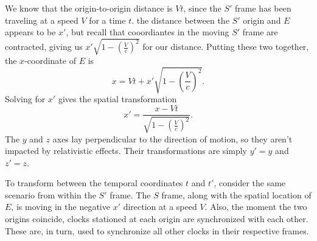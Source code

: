 \documentclass[10pt,a4paper,oneside]{book}
\begin{document}
We know that the origin-to-origin distance is $Vt$, since the $S'$ frame has been traveling at a speed $V$ for a time $t$.
the distance between the $S'$ origin and $E$ appears to be $x'$, but recall that cooordiantes in the moving $S'$ frame are contracted, giving us $x' \sqrt{1 - \left( \frac{V}{c} \right)^2}$ for our distance.
Putting these two together, the $x$-coordinate of $E$ is
\[ x = Vt + x'\sqrt{1 - \left( \frac{V}{c} \right)^2}. \]
Solving for $x'$ gives the spatial transformation
\[ x' = \frac{x - Vt}{\sqrt{1 - \left( \frac{V}{c} \right)^2}}. \]
The $y$ and $z$ axes lay perpendicular to the direction of motion, so they aren't impacted by relativistic effects.
Their transformations are simply $y' = y$ and $z' = z$.

To transform between the temporal coordinates $t$ and $t'$, consider the same scenario from within the $S'$ frame.
The $S$ frame, along with the spatial location of $E$, is moving in the negative $x'$ direction at a speed $V$.
Also, the moment the two origins coincide, clocks stationed at each origin are synchronized with each other.
These are, in turn, used to synchronize all other clocks in their respective frames.
\end{document}
